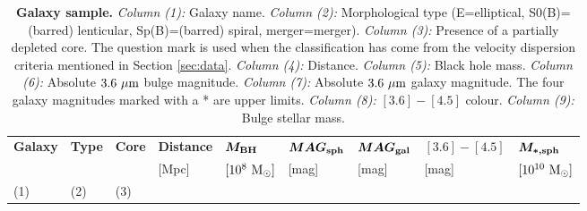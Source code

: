\begin{table*}                                        
\small                                                
\begin{center}                                        
\caption{{\bf Galaxy sample.}                        
\emph{Column (1):} Galaxy name.                       
\emph{Column (2):} Morphological type (E=elliptical, S0(B)=(barred) lenticular, Sp(B)=(barred) spiral, merger=merger).                       
\emph{Column (3):} Presence of a partially depleted core. 			The question mark is used when the classification has come from the velocity dispersion criteria mentioned in Section \ref{sec:data}.   
\emph{Column (4):} Distance.                                   
\emph{Column (5):} Black hole mass.                                   
\emph{Column (6):} Absolute $3.6\rm~\mu m$ bulge magnitude.                                   
\emph{Column (7):} Absolute $3.6\rm~\mu m$ galaxy magnitude. 			The four galaxy magnitudes marked with a * are upper limits.                                   
\emph{Column (8):} $[3.6]-[4.5]$ colour.                                   
\emph{Column (9):} Bulge stellar mass. }                      
\begin{tabular}{lllllllll}                           
\hline                                                
\multicolumn{1}{l}{{\bf Galaxy}} &                   
\multicolumn{1}{l}{{\bf Type}} &                     
\multicolumn{1}{l}{{\bf Core}} &                     
\multicolumn{1}{l}{{\bf Distance}} &                 
\multicolumn{1}{l}{{\bf $\bm{M_{\rm BH}}$}} &  
\multicolumn{1}{l}{{\bf $\bm{MAG_{\rm sph}}$}} &  
\multicolumn{1}{l}{{\bf $\bm{MAG_{\rm gal}}$}} &  
\multicolumn{1}{l}{{\bf $\bm{[3.6]-[4.5]}$}} &  
\multicolumn{1}{l}{{\bf $\bm{M_{\rm *,sph}}$}} \\  
\multicolumn{1}{l}{} &                                
\multicolumn{1}{l}{} &                                
\multicolumn{1}{l}{} &                                
\multicolumn{1}{l}{[Mpc]} &                           
\multicolumn{1}{l}{$[10^8~\rm M_{\odot}]$} &         
\multicolumn{1}{l}{[mag]} &                                
\multicolumn{1}{l}{[mag]} &                                
\multicolumn{1}{l}{[mag]} &                                
\multicolumn{1}{l}{$[10^{10}~\rm M_{\odot}]$} \\                             
\multicolumn{1}{l}{(1)} &                             
\multicolumn{1}{l}{(2)} &                             
\multicolumn{1}{l}{(3)} &                             

\end{tabular}
\end{center}
\end{table*}
